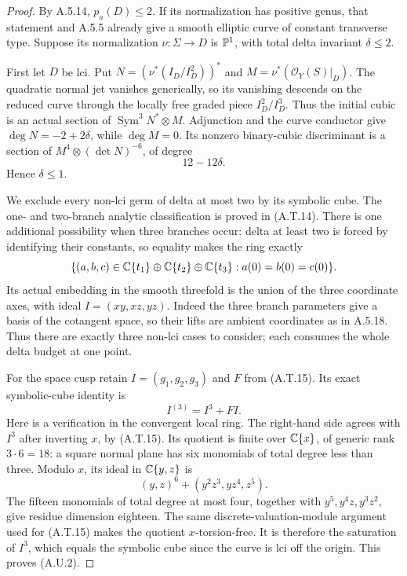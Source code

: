 \begin{proof}
By A.5.14, $p_a(D)\le2$. If its normalization has
positive genus, that statement and A.5.5 already give
a smooth elliptic curve of constant transverse type.
Suppose its normalization $\nu:\Sigma\to D$ is
$\mathbb P^1$, with total delta invariant $\delta\le2$.

First let $D$ be lci. Put
$N=(\nu^*(I_D/I_D^2))^*$ and
$M=\nu^*(\mathcal O_Y(S)|_D)$.
The quadratic normal jet vanishes generically, so
its vanishing descends on the reduced curve through
the locally free graded piece $I_D^2/I_D^3$.
Thus the initial cubic is an actual section of
$\operatorname{Sym}^3N^*\otimes M$.
Adjunction and the curve conductor give
$\deg N=-2+2\delta$, while $\deg M=0$.
Its nonzero binary-cubic discriminant is a section
of $M^4\otimes(\det N)^{-6}$, of degree
\[
                         12-12\delta.             \tag{A.U.1}
\]
Hence $\delta\le1$.

We exclude every non-lci germ of delta at most two
by its symbolic cube. The one- and two-branch analytic
classification is proved in (A.T.14). There is one
additional possibility when three branches occur:
delta at least two is forced by identifying their
constants, so equality makes the ring exactly
\[
 \{(a,b,c)\in\mathbb C\{t_1\}\oplus\mathbb C\{t_2\}\oplus\mathbb C\{t_3\}:
                      a(0)=b(0)=c(0)\}.
\]
Its actual embedding in the smooth threefold is the
union of the three coordinate axes, with ideal
$I=(xy,xz,yz)$. Indeed the three branch parameters
give a basis of the cotangent space, so their lifts
are ambient coordinates as in A.5.18.
Thus there are exactly three non-lci cases to consider;
each consumes the whole delta budget at one point.

For the space cusp retain $I=(g_1,g_2,g_3)$ and
$F$ from (A.T.15). Its exact symbolic-cube identity is
\[
                         I^{(3)}=I^3+FI.           \tag{A.U.2}
\]
Here is a verification in the convergent local ring.
The right-hand side agrees with $I^3$ after inverting
$x$, by (A.T.15). Its quotient is finite over
$\mathbb C\{x\}$, of generic rank $3\cdot6=18$: a square
normal plane has six monomials of total degree less
than three. Modulo $x$, its ideal in $\mathbb C\{y,z\}$ is
\[
 (y,z)^6+(y^2z^3,yz^4,z^5).
\]
The fifteen monomials of total degree at most four,
together with $y^5,y^4z,y^3z^2$, give residue dimension
eighteen. The same discrete-valuation-module argument
used for (A.T.15) makes the quotient $x$-torsion-free.
It is therefore the saturation of $I^3$, which equals
the symbolic cube since the curve is lci off the origin.
This proves (A.U.2).


\end{proof}
